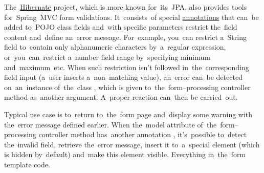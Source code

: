 The~\hyperref[hibernate]{Hibernate} project, which is more known for~its~JPA, also provides tools for~Spring~MVC form validations.
It~consists~of special \hyperref[javaannotation]{annotations} that can~be added to~POJO class fields and~with specific parameters restrict the~field content and~define an~error message.
For~example, you~can restrict a~String field to~contain only alphanumeric characters by~a~regular expression, or~you~can~restrict a~number field range by~specifying minimum and~maximum~etc.
When such restriction isn't followed in~the~corresponding field input (a~user inserts a~non--matching value), an~error can~be detected on~an~instance of~the~class , which is given to~the~form--processing controller method as~another argument.
A~proper reaction can~then be carried~out.

Typical use case is to~return to~the~form page and~display some warning with the~error message defined earlier.
When the~model attribute of~the~form--processing controller method has~another annotation , it's~possible to~detect the~invalid field, retrieve the~error message, insert it to~a~special element (which is hidden by~default) and~make this element visible.
Everything in~the~form template code.
\newpage

